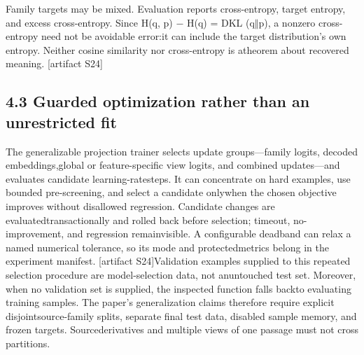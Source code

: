 \noindent
Family targets may be mixed. Evaluation reports cross-entropy, target entropy, and excess cross-\linebreak[4]
entropy. Since H(q, p) \ensuremath{-} H(q) = DKL (q\ensuremath{\Vert}p), a nonzero cross-entropy need not be avoidable error:\linebreak[4]
it can include the target distribution's own entropy. Neither cosine similarity nor cross-entropy is a\linebreak[4]
theorem about recovered meaning. [artifact S24]\par

\subsection*{4.3  Guarded optimization rather than an unrestricted fit}
\noindent
The generalizable projection trainer selects update groups---family logits, decoded embeddings,\linebreak[4]
global or feature-specific view logits, and combined updates---and evaluates candidate learning-rate\linebreak[4]
steps. It can concentrate on hard examples, use bounded pre-screening, and select a candidate only\linebreak[4]
when the chosen objective improves without disallowed regression. Candidate changes are evaluated\linebreak[4]
transactionally and rolled back before selection; timeout, no-improvement, and regression remain\linebreak[4]
visible. A configurable deadband can relax a named numerical tolerance, so its mode and protected\linebreak[4]
metrics belong in the experiment manifest. [artifact S24]\linebreak[4]
Validation examples supplied to this repeated selection procedure are model-selection data, not an\linebreak[4]
untouched test set. Moreover, when no validation set is supplied, the inspected function falls back\linebreak[4]
to evaluating training samples. The paper's generalization claims therefore require explicit disjoint\linebreak[4]
source-family splits, separate final test data, disabled sample memory, and frozen targets. Source\linebreak[4]
derivatives and multiple views of one passage must not cross partitions.\par

